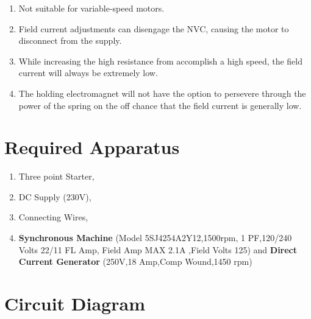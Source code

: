 \documentclass[a4paper,12pt]{article}
\begin{document}
	\begin{enumerate}
		\item Not suitable for variable-speed motors.
		\item Field current adjustments can disengage the NVC, causing the motor to disconnect from the supply.
		\item While increasing the high resistance from accomplish a high speed, the field current will always be extremely low.
		\item The holding electromagnet will not have the option to persevere through the power of the spring on the off chance that the field current is generally low.
	\end{enumerate}
	
	
	
	
	\section{Required Apparatus}
		\begin{enumerate}
		\item Three point Starter,
		\item DC Supply (230V),
		\item Connecting Wires,
		\item \textbf{Synchronous Machine} (Model 5SJ4254A2Y12,1500rpm, 1 PF,120/240 Volts 22/11 FL Amp, Field Amp MAX 2.1A ,Field Volts 125)  and  \textbf{Direct Current Generator} (250V,18 Amp,Comp Wound,1450 rpm) 
		
	\end{enumerate}

	\section{Circuit Diagram}
\end{document}

